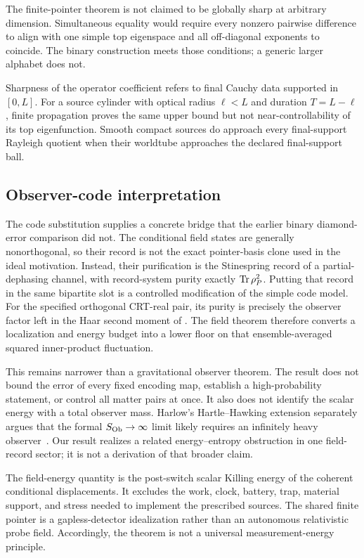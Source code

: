 The finite-pointer theorem is not claimed to be globally sharp at arbitrary
dimension.  Simultaneous equality would require every nonzero pairwise
difference to align with one simple top eigenspace and all off-diagonal
exponents to coincide.  The binary construction meets those conditions; a
generic larger alphabet does not.

Sharpness of the operator coefficient refers to final Cauchy data supported
in $[0,L]$.  For a source cylinder with optical radius $\ell<L$ and duration
$T=L-\ell$, finite propagation proves the same upper bound but not
near-controllability of its top eigenfunction.  Smooth compact sources do
approach every final-support Rayleigh quotient when their worldtube approaches
the declared final-support ball.

\subsection{Observer-code interpretation}

The code substitution supplies a concrete bridge that the earlier binary
diamond-error comparison did not.  The conditional field states are generally
nonorthogonal, so their record is not the exact pointer-basis clone used in the
ideal motivation.  Instead, their purification is the Stinespring record of a
partial-dephasing channel, with record-system purity exactly $\operatorname{Tr}\rho_P^2$.
Putting that record in the same bipartite slot is a controlled modification of
the simple code model.  For the specified orthogonal CRT-real pair, its purity
is precisely the observer factor left in the Haar second moment of
\cite{HarlowUsatyukZhao2025}.  The field theorem therefore converts a
localization and energy budget into a lower floor on that ensemble-averaged
squared inner-product fluctuation.

This remains narrower than a gravitational observer theorem.  The result
does not bound the error of every fixed encoding map, establish a
high-probability statement, or control all matter pairs at once.  It also
does not identify the scalar energy with a total observer mass.  Harlow's
Hartle--Hawking extension separately argues that the formal
$S_{\rm Ob}\to\infty$ limit likely requires an infinitely heavy
observer~\cite{Harlow2026Observers}.  Our result realizes a related
energy--entropy obstruction in one field-record sector; it is not a
derivation of that broader claim.

The field-energy quantity is the post-switch scalar Killing energy of the
coherent conditional displacements.  It excludes the work, clock, battery,
trap, material support, and stress needed to implement the prescribed
sources.  The shared finite pointer is a gapless-detector idealization rather
than an autonomous relativistic probe field.  Accordingly, the theorem is not
a universal measurement-energy principle.

